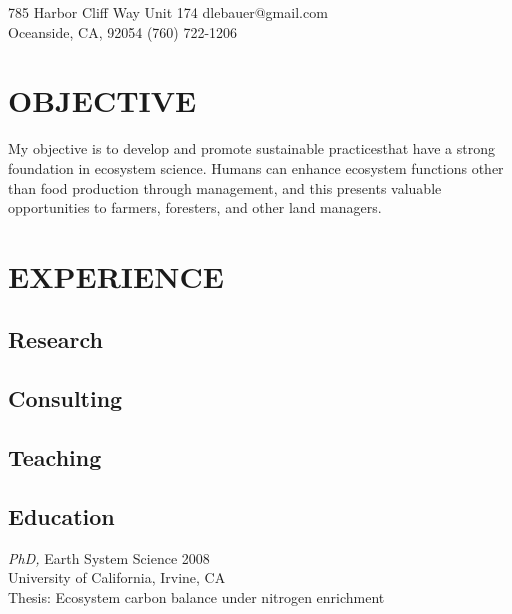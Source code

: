 \documentclass[line]{res}
\begin{document}

 
\begin{resume}

785 Harbor Cliff Way Unit 174 \hfill dlebauer@gmail.com\\
Oceanside, CA, 92054 \hfill (760) 722-1206\\

 
\vspace{0.2in}
\section{OBJECTIVE} My objective is to develop and promote sustainable practicesthat have a strong foundation in ecosystem science. Humans can enhance ecosystem functions other than food production through management, and this presents valuable opportunities to farmers, foresters, and other land managers.   
\section{EXPERIENCE}
\subsection{Research}
\subsection{Consulting}
\subsection{Teaching}
\subsection{Education}

 {\sl PhD,} Earth System Science \hfill 2008 \\
                \hfill University of California, Irvine, CA\\
                Thesis: Ecosystem carbon balance under nitrogen enrichment
                 

\end{resume}
\end{document}
